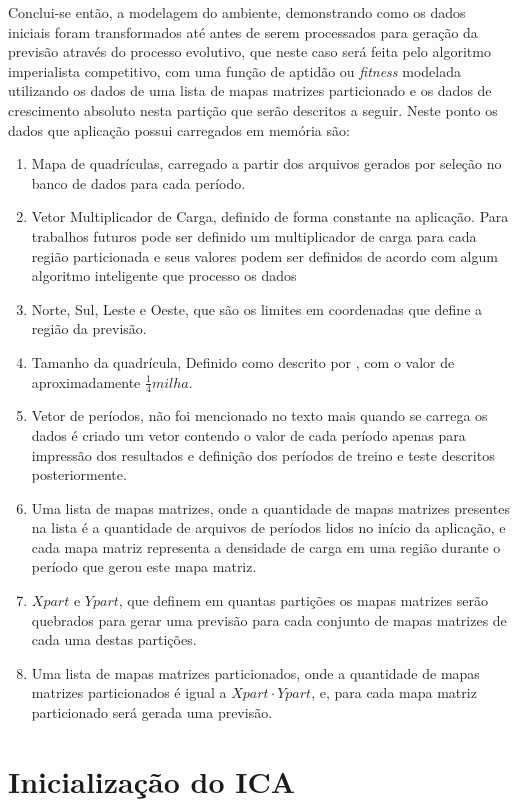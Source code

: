 Conclui-se então, a modelagem do ambiente, demonstrando como os dados iniciais foram transformados até antes de serem processados para geração da previsão através do processo evolutivo, que neste caso será feita pelo algoritmo imperialista competitivo, com uma função de aptidão ou \emph{fitness} modelada utilizando os dados de uma lista de mapas matrizes particionado e os dados de crescimento absoluto nesta partição que serão descritos a seguir. Neste ponto os dados que aplicação possui carregados em memória são:
\begin{enumerate}
\item Mapa de quadrículas, carregado a partir dos arquivos gerados por seleção no banco de dados para cada período.
\item Vetor Multiplicador de Carga, definido de forma constante na aplicação. Para trabalhos futuros pode ser definido um multiplicador de carga para cada região particionada e seus valores podem ser definidos de acordo com algum algoritmo inteligente que processo os dados
\item Norte, Sul, Leste e Oeste, que são os limites em coordenadas que define a região da previsão.
\item Tamanho da quadrícula, Definido como descrito por \citeauthor{willis2002spatial}, com o valor de aproximadamente \(\frac{1}{4} milha\).
\item Vetor de períodos, não foi mencionado no texto mais quando se carrega os dados é criado um vetor contendo o valor de cada período apenas para impressão dos resultados  e definição dos períodos de treino e teste descritos posteriormente.
\item Uma lista de mapas matrizes, onde a quantidade de mapas matrizes presentes na lista é a quantidade de arquivos de períodos lidos no início da aplicação, e cada mapa matriz representa a densidade de carga em uma região durante o período que gerou este mapa matriz.
\item \(Xpart\) e \(Ypart\), que definem em quantas partições os mapas matrizes  serão quebrados para gerar uma previsão para cada conjunto de mapas matrizes de cada  uma destas partições.
\item Uma lista de mapas matrizes particionados, onde a quantidade de mapas matrizes particionados é igual a \(Xpart \cdot Ypart\),  e, para cada mapa matriz particionado será gerada uma previsão. 
\end{enumerate}


\section{Inicialização do ICA}
\label{Inicialização do ICA}

